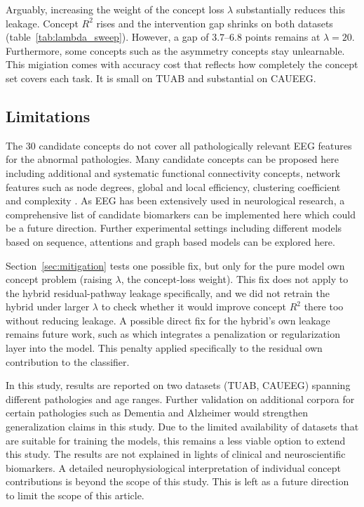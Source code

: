 \documentclass[journal,twoside,web]{ieeecolor}
\begin{document}
Arguably, increasing the weight of the concept loss $\lambda$ substantially reduces this leakage. Concept $R^2$ rises and the intervention gap shrinks on both datasets (table~\ref{tab:lambda_sweep}). However, a gap of $3.7$--$6.8$ points remains at $\lambda = 20$. Furthermore, some concepts such as the asymmetry concepts stay unlearnable. This migiation comes with accuracy cost that reflects how completely the concept set covers each task. It is small on TUAB and substantial on CAUEEG. 


\subsection{Limitations}

The $30$ candidate concepts do not cover all pathologically relevant EEG features for the abnormal pathologies. Many candidate concepts can be proposed here including additional and systematic functional connectivity concepts, network features such as node degrees, global and local efficiency, clustering coefficient and complexity \cite{10.1007/978-981-95-9575-4_2}. As EEG has been extensively used in neurological research, a comprehensive list of candidate biomarkers can be implemented here which could be a future direction. Further experimental settings including different models based on sequence, attentions and graph based models can be explored here.  

Section~\ref{sec:mitigation} tests one possible fix, but only for the pure model own concept problem (raising $\lambda$, the concept-loss weight). This fix does not apply to the hybrid residual-pathway leakage specifically, and we did not retrain the hybrid under larger $\lambda$ to check whether it would improve concept $R^2$ there too without reducing leakage. A possible direct fix for the hybrid's own leakage remains future work, such as \cite{galliamov2026conceptsinformationbottleneckmodels} which integrates a penalization or regularization layer into the model. This penalty applied specifically to the residual own contribution to the classifier.

In this study, results are reported on two datasets (TUAB, CAUEEG) spanning different pathologies and age ranges. Further validation on additional corpora for certain pathologies such as Dementia and Alzheimer would strengthen generalization claims in this study. Due to the limited availability of datasets that are suitable for training the models, this remains a less viable option to extend this study. The results are not explained in lights of clinical and neuroscientific biomarkers. A detailed neurophysiological interpretation of individual concept contributions is beyond the scope of this study. This is left as a future direction to limit the scope of this article. 
\end{document}
